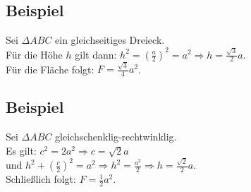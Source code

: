 \subsection{Beispiel}

	Sei $\Delta ABC$ ein gleichseitiges Dreieck.\\
	\newline
	Für die Höhe $h$ gilt dann: $h^2=\left(\frac{a}{2}\right)^2=a^2\Rightarrow h=\frac{\sqrt{3}}{2}a$.\\
	Für die Fläche folgt: $F=\frac{\sqrt{3}}{4}a^2$.


\subsection{Beispiel}

	
	Sei $\Delta ABC$ gleichschenklig-rechtwinklig.\\
	\newline
	Es gilt: $c^2=2a^2\Rightarrow c=\sqrt{2}a$\\
	und $h^2+\left(\frac{c}{2}\right)^2=a^2\Rightarrow h^2=\frac{a^2}{2}\Rightarrow h=\frac{\sqrt{2}}{2}a$.\\
	Schließlich folgt: $F=\frac{1}{2}a^2$.
	